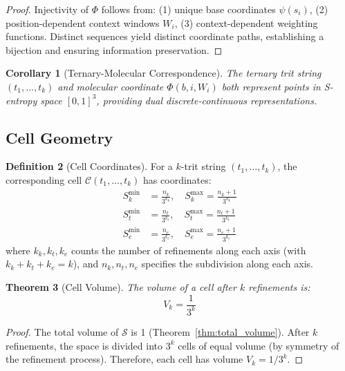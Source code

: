 \documentclass[11pt,twocolumn,a4paper]{article}
\newtheorem{theorem}{Theorem}[section]
\newtheorem{corollary}[theorem]{Corollary}
\theoremstyle{definition}
\newtheorem{definition}[theorem]{Definition}
\theoremstyle{remark}
\newcommand{\Sspace}{\mathcal{S}}
\newcommand{\Sk}{S_k}
\newcommand{\St}{S_t}
\newcommand{\Se}{S_e}
\begin{document}
\begin{proof}
Injectivity of $\Phi$ follows from: (1) unique base coordinates $\psi(s_i)$, (2) position-dependent context windows $W_i$, (3) context-dependent weighting functions. Distinct sequences yield distinct coordinate paths, establishing a bijection and ensuring information preservation.
\end{proof}

\begin{corollary}[Ternary-Molecular Correspondence]
\label{cor:ternary_molecular}
The ternary trit string $(t_1,...,t_k)$ and molecular coordinate $\Phi(b,i,W_i)$ both represent points in S-entropy space $[0,1]^3$, providing dual discrete-continuous representations.
\end{corollary}

\subsection{Cell Geometry}

\begin{definition}[Cell Coordinates]
\label{def:cell_coordinates}
For a $k$-trit string $(t_1,\ldots,t_k)$, the corresponding cell $\mathcal{C}(t_1,\ldots,t_k)$ has coordinates:
\begin{align}
\Sk^{\min} &= \frac{n_k}{3^{k_k}}, \quad \Sk^{\max} = \frac{n_k+1}{3^{k_k}} \label{eq:Sk_cell} \\
\St^{\min} &= \frac{n_t}{3^{k_t}}, \quad \St^{\max} = \frac{n_t+1}{3^{k_t}} \label{eq:St_cell} \\
\Se^{\min} &= \frac{n_e}{3^{k_e}}, \quad \Se^{\max} = \frac{n_e+1}{3^{k_e}} \label{eq:Se_cell}
\end{align}
where $k_k, k_t, k_e$ counts the number of refinements along each axis (with $k_k + k_t + k_e = k$), and $n_k, n_t, n_e$ specifies the subdivision along each axis.
\end{definition}

\begin{theorem}[Cell Volume]
\label{thm:cell_volume}
The volume of a cell after $k$ refinements is:
\begin{equation}
V_k = \frac{1}{3^k}
\label{eq:cell_volume}
\end{equation}
\end{theorem}

\begin{proof}
The total volume of $\Sspace$ is 1 (Theorem~\ref{thm:total_volume}). After $k$ refinements, the space is divided into $3^k$ cells of equal volume (by symmetry of the refinement process). Therefore, each cell has volume $V_k = 1/3^k$.
\end{proof}
\end{document}
